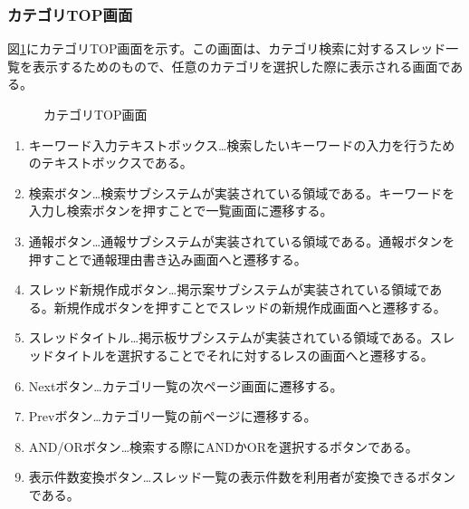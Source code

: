 \documentclass[a4j]{jarticle}
\begin{document}
\subsubsection{カテゴリTOP画面}
図\ref{fig:category_top}にカテゴリTOP画面を示す。この画面は、カテゴリ検索に対するスレッド一覧を表示するためのもので、任意のカテゴリを選択した際に表示される画面である。
\begin{figure}[H]
\centering
{}
\caption{カテゴリTOP画面}
\label{fig:category_top}
\end{figure}
\begin{enumerate}
  \renewcommand{\labelenumi}{\textcircled{\scriptsize \theenumi}}

\item キーワード入力テキストボックス…検索したいキーワードの入力を行うためのテキストボックスである。
\item 検索ボタン…検索サブシステムが実装されている領域である。キーワードを入力し検索ボタンを押すことで一覧画面に遷移する。
\item 通報ボタン…通報サブシステムが実装されている領域である。通報ボタンを押すことで通報理由書き込み画面へと遷移する。
\item スレッド新規作成ボタン…掲示案サブシステムが実装されている領域である。新規作成ボタンを押すことでスレッドの新規作成画面へと遷移する。
\item スレッドタイトル…掲示板サブシステムが実装されている領域である。スレッドタイトルを選択することでそれに対するレスの画面へと遷移する。
\item Nextボタン…カテゴリ一覧の次ページ画面に遷移する。
\item Prevボタン…カテゴリ一覧の前ページに遷移する。
\item AND/ORボタン…検索する際にANDかORを選択するボタンである。
\item 表示件数変換ボタン…スレッド一覧の表示件数を利用者が変換できるボタンである。

\end{enumerate}
\end{document}
